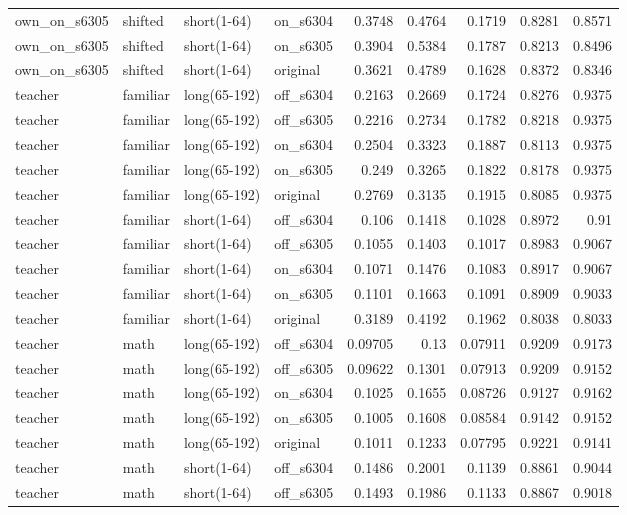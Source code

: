 \begin{table}
\begin{tabular}{llllrrrrr}
own\_on\_s6305 & shifted & short(1-64) & on\_s6304 & 0.3748 & 0.4764 & 0.1719 & 0.8281 & 0.8571 \\
own\_on\_s6305 & shifted & short(1-64) & on\_s6305 & 0.3904 & 0.5384 & 0.1787 & 0.8213 & 0.8496 \\
own\_on\_s6305 & shifted & short(1-64) & original & 0.3621 & 0.4789 & 0.1628 & 0.8372 & 0.8346 \\
teacher & familiar & long(65-192) & off\_s6304 & 0.2163 & 0.2669 & 0.1724 & 0.8276 & 0.9375 \\
teacher & familiar & long(65-192) & off\_s6305 & 0.2216 & 0.2734 & 0.1782 & 0.8218 & 0.9375 \\
teacher & familiar & long(65-192) & on\_s6304 & 0.2504 & 0.3323 & 0.1887 & 0.8113 & 0.9375 \\
teacher & familiar & long(65-192) & on\_s6305 & 0.249 & 0.3265 & 0.1822 & 0.8178 & 0.9375 \\
teacher & familiar & long(65-192) & original & 0.2769 & 0.3135 & 0.1915 & 0.8085 & 0.9375 \\
teacher & familiar & short(1-64) & off\_s6304 & 0.106 & 0.1418 & 0.1028 & 0.8972 & 0.91 \\
teacher & familiar & short(1-64) & off\_s6305 & 0.1055 & 0.1403 & 0.1017 & 0.8983 & 0.9067 \\
teacher & familiar & short(1-64) & on\_s6304 & 0.1071 & 0.1476 & 0.1083 & 0.8917 & 0.9067 \\
teacher & familiar & short(1-64) & on\_s6305 & 0.1101 & 0.1663 & 0.1091 & 0.8909 & 0.9033 \\
teacher & familiar & short(1-64) & original & 0.3189 & 0.4192 & 0.1962 & 0.8038 & 0.8033 \\
teacher & math & long(65-192) & off\_s6304 & 0.09705 & 0.13 & 0.07911 & 0.9209 & 0.9173 \\
teacher & math & long(65-192) & off\_s6305 & 0.09622 & 0.1301 & 0.07913 & 0.9209 & 0.9152 \\
teacher & math & long(65-192) & on\_s6304 & 0.1025 & 0.1655 & 0.08726 & 0.9127 & 0.9162 \\
teacher & math & long(65-192) & on\_s6305 & 0.1005 & 0.1608 & 0.08584 & 0.9142 & 0.9152 \\
teacher & math & long(65-192) & original & 0.1011 & 0.1233 & 0.07795 & 0.9221 & 0.9141 \\
teacher & math & short(1-64) & off\_s6304 & 0.1486 & 0.2001 & 0.1139 & 0.8861 & 0.9044 \\
teacher & math & short(1-64) & off\_s6305 & 0.1493 & 0.1986 & 0.1133 & 0.8867 & 0.9018 \\

\end{tabular}
\end{table}
